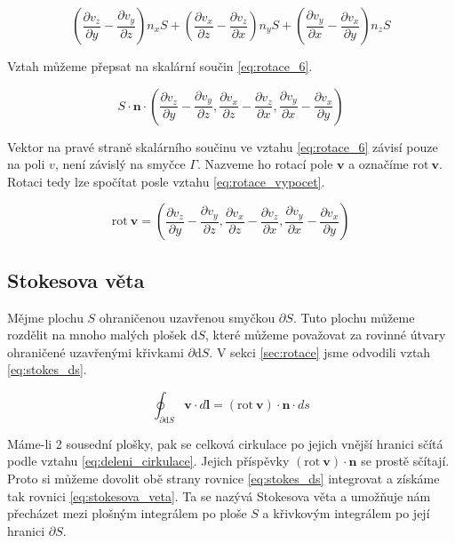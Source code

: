 \documentclass{book}
\newcommand{\vect}[1]{\boldsymbol{#1}}
\newcommand{\rot}{\mathrm{rot}}
\begin{document}
\begin{equation}
\label{eq:rotace_5}
\left( \frac{\partial v_z}{\partial y} - \frac{\partial v_y}{\partial z} \right) n_x S + \left( \frac{\partial v_x}{\partial z} - \frac{\partial v_z}{\partial x} \right) n_y S + \left( \frac{\partial v_y}{\partial x} - \frac{\partial v_x}{\partial y} \right) n_z S 
\end{equation}

Vztah můžeme přepsat na skalární součin \eqref{eq:rotace_6}.

\begin{equation}
\label{eq:rotace_6}
S \cdot \vect{n} \cdot \left(\frac{\partial v_z}{\partial y} - \frac{\partial v_y}{\partial z}, \frac{\partial v_x}{\partial z} - \frac{\partial v_z}{\partial x}, \frac{\partial v_y}{\partial x} - \frac{\partial v_x}{\partial y} \right)
\end{equation}

Vektor na pravé straně skalárního součinu ve vztahu \eqref{eq:rotace_6} závisí pouze na poli \(v\), není závislý na smyčce \(\Gamma\). Nazveme ho rotací pole \(\vect{v}\) a označíme \(\rot \ \vect{v}\). Rotaci tedy lze spočítat posle vztahu \eqref{eq:rotace_vypocet}.

\begin{equation}
\label{eq:rotace_vypocet}
\rot \ \vect{v} = \left(\frac{\partial v_z}{\partial y} - \frac{\partial v_y}{\partial z}, \frac{\partial v_x}{\partial z} - \frac{\partial v_z}{\partial x}, \frac{\partial v_y}{\partial x} - \frac{\partial v_x}{\partial y} \right)
\end{equation}


\subsection{Stokesova věta}

Mějme plochu \(S\) ohraničenou uzavřenou smyčkou \(\partial S\). Tuto plochu můžeme rozdělit na mnoho malých plošek \(\mathrm{d}S\), které můžeme považovat za rovinné útvary ohraničené uzavřenými křivkami \(\partial \mathrm{d}S\). V sekci \ref{sec:rotace} jsme odvodili vztah \eqref{eq:stokes_ds}.

\begin{equation}
\label{eq:stokes_ds}
\oint_{\partial \mathrm{d}S} \vect{v} \cdot d\vect{l} = (\rot \ \vect{v}) \cdot \vect{n} \cdot ds
\end{equation}

Máme-li 2 sousední plošky, pak se celková cirkulace po jejich vnější hranici sčítá podle vztahu \eqref{eq:deleni_cirkulace}. Jejich příspěvky \((\rot \ \vect{v}) \cdot \vect{n}\) se prostě sčítají. Proto si můžeme dovolit obě strany rovnice \eqref{eq:stokes_ds} integrovat a získáme tak rovnici \eqref{eq:stokesova_veta}. Ta se nazývá Stokesova věta a umožňuje nám přecházet mezi plošným integrálem po ploše \(S\) a křivkovým integrálem po její hranici \(\partial S\).
\end{document}
